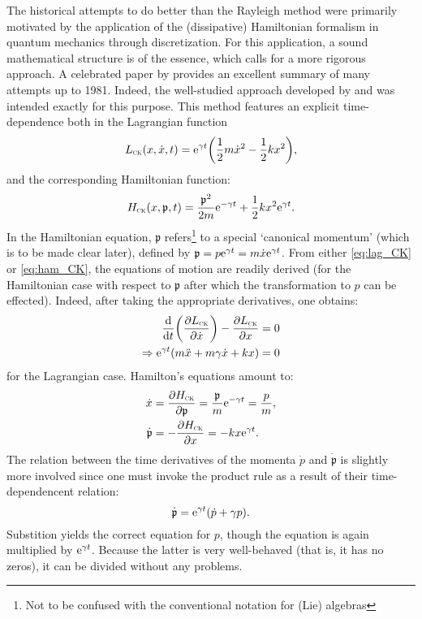 The historical attempts to do better than the Rayleigh method were primarily motivated by the application of the
(dissipative) Hamiltonian formalism in quantum mechanics through discretization. For this application, a sound
mathematical structure is of the essence, which calls for a more rigorous approach. A celebrated paper by
\citet{Dekker1981} provides an excellent summary of many attempts up to 1981. Indeed, the well-studied approach
developed by \citet{Caldirola1941} and \citet{Kanai1948} was intended exactly for this purpose. This method features an
explicit time-dependence both in the Lagrangian function
\begin{equation}
    L_\text{\tiny{\textsc{CK}}}(x, \dot{x}, t) = \mathrm{e}^{\gamma t}\qty(\frac{1}{2}m\dot{x}^2 - \frac{1}{2}kx^2),
    \label{eq:lag_CK}
\end{equation}
and the corresponding Hamiltonian function:
\begin{equation}
    H_\text{\tiny{\textsc{CK}}}(x, \mathfrak{p}, t) = \frac{\mathfrak{p}^2}{2m}\mathrm{e}^{-\gamma t} + \frac{1}{2}kx^2\mathrm{e}^{\gamma t}.
    \label{eq:ham_CK}
\end{equation}
In the Hamiltonian equation, $\mathfrak{p}$ refers\footnote{Not to be confused with the conventional notation for (Lie)
algebras} to a special `canonical momentum' (which is to be made clear later), defined by $\mathfrak{p} = p\mathrm{e}^{\gamma
t} = m\dot{x}\mathrm{e}^{\gamma t}$. From either \cref{eq:lag_CK} or \cref{eq:ham_CK}, the equations of motion are readily
derived (for the Hamiltonian case with respect to $\mathfrak{p}$ after which the transformation to $p$ can be effected).
Indeed, after taking the appropriate derivatives, one obtains:
\begin{equation*} 
    \begin{split}
        \dv{}{t}\qty(\pdv{\ensuremath{L_\text{\tiny{\textsc{CK}}}}}{\dot{x}}) - \pdv{\ensuremath{L_\text{\tiny{\textsc{CK}}}}}{x} &= 0 \\
        \Rightarrow \mathrm{e}^{\gamma t}\qty(m\ddot{x} + m\gamma\dot{x} + kx) &= 0
    \end{split}
\end{equation*}
for the Lagrangian case. Hamilton's equations amount to: \cite{Tokieda2021}
\begin{equation*}
    \begin{split}
        \dot{x} &= \pdv{\ensuremath{H_\text{\tiny{\textsc{CK}}}}}{\mathfrak{p}} = \frac{\mathfrak{p}}{m}\mathrm{e}^{-\gamma t} =  \frac{p}{m}, \\
        \dot{\mathfrak{p}} &= -\pdv{\ensuremath{H_\text{\tiny{\textsc{CK}}}}}{x} = -kx\mathrm{e}^{\gamma t}.\\
    \end{split}
\end{equation*}
The relation between the time derivatives of the momenta $\dot{p}$ and $\dot{\mathfrak{p}}$ is slightly more
involved since one must invoke the product rule as a result of their time-dependencent relation:
    $$ \dot{\mathfrak{p}} = \mathrm{e}^{\gamma t}\qty(\dot{p} + \gamma p). $$
Substition yields the correct equation for $p$, though the equation is again multiplied by $\mathrm{e}^{\gamma t}$. Because the
latter is very well-behaved (that is, it has no zeros), it can be divided without any problems.


